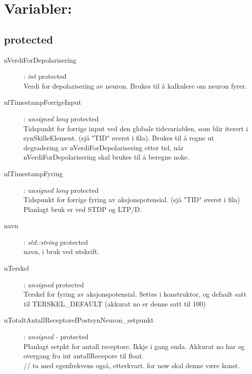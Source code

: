 \documentclass[norsk,11 pt]{report}
\begin{document}
	\section{Variabler:}
		\subsection{protected}
			\begin{description}
				\item[nVerdiForDepolarisering] : \textit{int} 		  \hspace{3cm} protected \\
				Verdi for depolarisering av neuron. Brukes til å kalkulere om neuron fyrer. 
				\item[ulTimestampForrigeInput] : \textit{unsigned long} \hspace{5cm}	protected \\
				Tidspunkt for forrige input ved den globale tidsvariablen, som blir iterert i synSkilleElement. (sjå "TID" øverst i fila).
				Brukes til å regne ut degradering av nVerdiForDepolarisering etter tid, når nVerdiForDepolarisering skal brukes til å beregne noke.
				\item[ulTimestampFyring]  	 : \textit{unsigned long} \hspace{5cm}	protected \\
				Tidspunkt for forrige fyring av aksjonspotensial. (sjå "TID" øverst i fila)\\
				Planlagt bruk er ved STDP og LTP/D.
				
				\item[navn] 			 : \textit{std::string} \hspace{4cm}	protected\\
				navn, i bruk ved utskrift.
			
				\item[uTerskel] 		  	:  \textit{unsigned}  	\hspace{3cm}	protected\\
				Terskel for fyring av aksjonspotensial. Settes i konstruktor, og default satt til TERSKEL\_DEFAULT (akkurat no er denne satt til 100)
				
				\item[uTotaltAntallReceptoreIPostsynNeuron\_setpunkt] : \textit{unsigned} \indent - protected \\
				Planlagt setpkt for antall receptore. Ikkje i gang enda. Akkurat no har eg overgang fra int antallRecepore til float.\\
				// ta med egenfrekvens også, etterkvart. for now skal denne være konst.
 			\end{description}
\end{document}
